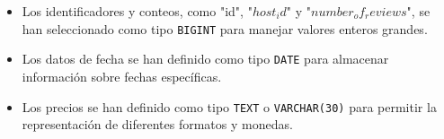 \begin{enumerate}
\begin{itemize}
        \item Los identificadores y conteos, como "id", "$host_id$" y "$number_of_reviews$", se han seleccionado como tipo \texttt{BIGINT} para manejar valores enteros grandes.

        \item Los datos de fecha se han definido como tipo \texttt{DATE} para almacenar información sobre fechas específicas.

        \item Los precios se han definido como tipo \texttt{TEXT} o \texttt{VARCHAR(30)} para permitir la representación de diferentes formatos y monedas.
    \end{itemize}

\end{enumerate}